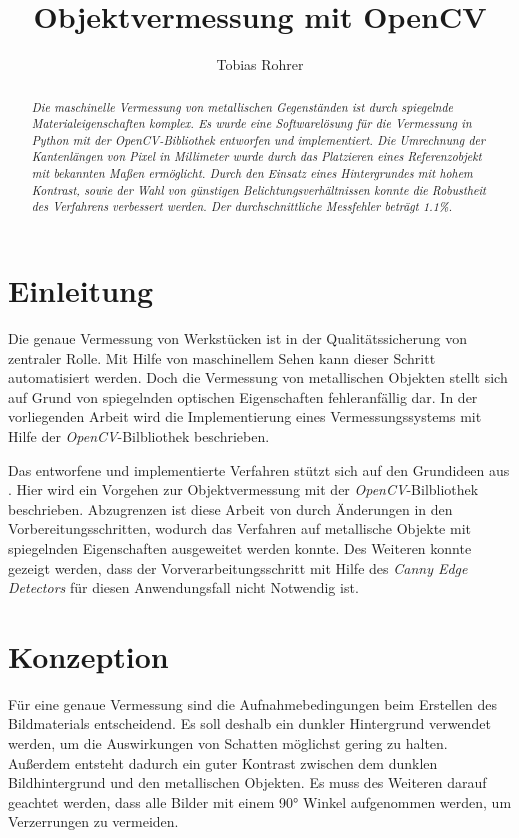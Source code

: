 \documentclass[twocolumn,10pt]{asme2ej}
\title{Objektvermessung mit OpenCV}
\author{Tobias Rohrer
    \affiliation{
	Hochschule Darmstadt\\
	Data Science (Master)\\
    Email: Tobias.Rohrer@outlook.com
    }	
}
\begin{document}
\maketitle    

\begin{abstract}
{\it Die maschinelle Vermessung von metallischen Gegenständen ist durch spiegelnde Materialeigenschaften komplex. Es wurde eine Softwarelösung für die Vermessung in Python mit der \emph{OpenCV}-Bibliothek\cite{opencv_library} entworfen und implementiert. Die Umrechnung der Kantenlängen von Pixel in Millimeter wurde durch das Platzieren eines Referenzobjekt mit bekannten Maßen ermöglicht. Durch den Einsatz eines Hintergrundes mit hohem Kontrast, sowie der Wahl von günstigen Belichtungsverhältnissen konnte die Robustheit des Verfahrens verbessert werden. Der durchschnittliche Messfehler beträgt 1.1\%.
}
\end{abstract}

\section{Einleitung}
Die genaue Vermessung von Werkstücken ist in der Qualitätssicherung von zentraler Rolle. Mit Hilfe von maschinellem Sehen kann dieser Schritt automatisiert werden. Doch die Vermessung von metallischen Objekten stellt sich auf Grund von spiegelnden optischen Eigenschaften fehleranfällig dar. In der vorliegenden Arbeit wird die Implementierung eines Vermessungssystems mit Hilfe der \emph{OpenCV}-Bilbliothek beschrieben. 

Das entworfene und implementierte Verfahren stützt sich auf den Grundideen aus \cite{PyImageSearch}. Hier wird ein Vorgehen zur Objektvermessung mit der  \emph{OpenCV}-Bilbliothek beschrieben. Abzugrenzen ist diese Arbeit von \cite{PyImageSearch} durch Änderungen in den Vorbereitungsschritten, wodurch das Verfahren auf metallische Objekte mit spiegelnden Eigenschaften ausgeweitet werden konnte. Des Weiteren konnte gezeigt werden, dass der Vorverarbeitungsschritt mit Hilfe des \emph{Canny Edge Detectors}\cite{Canny} für diesen Anwendungsfall nicht Notwendig ist.

\section{Konzeption}\label{sec:2}
Für eine genaue Vermessung sind die Aufnahmebedingungen beim Erstellen des Bildmaterials entscheidend. Es soll deshalb ein dunkler Hintergrund verwendet werden, um die Auswirkungen von Schatten möglichst gering zu halten. Außerdem entsteht dadurch ein guter Kontrast zwischen dem dunklen Bildhintergrund und den metallischen Objekten. Es muss des Weiteren darauf geachtet werden, dass alle Bilder mit einem \ang{90} Winkel aufgenommen werden, um Verzerrungen zu vermeiden.
\end{document}
